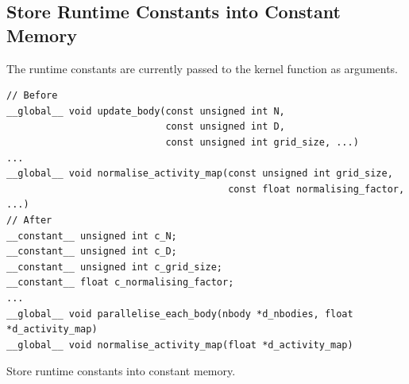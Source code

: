\documentclass[12pt, a4paper]{article}
\begin{document}
\subsection{Store Runtime Constants into Constant Memory}
The runtime constants are currently passed to the kernel function as arguments.

\begin{listing}[H]
  \begin{verbatim}
// Before
__global__ void update_body(const unsigned int N,
                            const unsigned int D,
                            const unsigned int grid_size, ...)
...
__global__ void normalise_activity_map(const unsigned int grid_size,
                                       const float normalising_factor, ...)
// After
__constant__ unsigned int c_N;
__constant__ unsigned int c_D;
__constant__ unsigned int c_grid_size;
__constant__ float c_normalising_factor;
...
__global__ void parallelise_each_body(nbody *d_nbodies, float *d_activity_map)
__global__ void normalise_activity_map(float *d_activity_map)
  \end{verbatim}
  \caption{Store runtime constants into constant memory.}
  \label{listing:constant_runtime_constants}
\end{listing}
\end{document}
